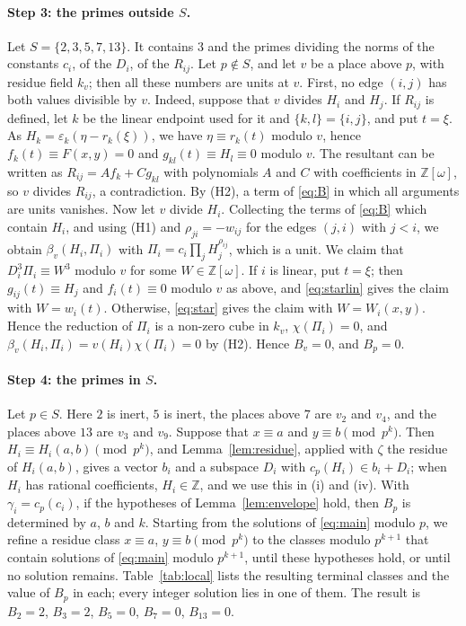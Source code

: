\documentclass[11pt]{article}
\newcommand{\Z}{\mathbb{Z}}
\begin{document}
\paragraph{Step 3: the primes outside $S$.} Let $S=\{2,3,5,7,13\}$. It contains $3$ and the primes dividing the norms of the constants $c_i$, of the $D_i$, of the $R_{ij}$. Let $p\notin S$, and let $v$ be a place above $p$, with residue field $k_v$; then all these numbers are units at $v$. First, no edge $(i,j)$ has both values divisible by $v$. Indeed, suppose that $v$ divides $H_i$ and $H_j$. If $R_{ij}$ is defined, let $k$ be the linear endpoint used for it and $\{k,l\}=\{i,j\}$, and put $t=\xi$. As $H_k=\varepsilon_k(\eta-r_k(\xi))$, we have $\eta\equiv r_k(t)$ modulo $v$, hence $f_k(t)\equiv F(x,y)=0$ and $g_{kl}(t)\equiv H_l\equiv0$ modulo $v$. The resultant can be written as $R_{ij}=Af_k+Cg_{kl}$ with polynomials $A$ and $C$ with coefficients in $\Z[\omega]$, so $v$ divides $R_{ij}$, a contradiction. By (H2), a term of \eqref{eq:B} in which all arguments are units vanishes. Now let $v$ divide $H_i$. Collecting the terms of \eqref{eq:B} which contain $H_i$, and using (H1) and $\rho_{ji}=-w_{ij}$ for the edges $(j,i)$ with $j<i$, we obtain $\beta_v(H_i,\Pi_i)$ with $\Pi_i=c_i\prod_jH_j^{\rho_{ij}}$, which is a unit. We claim that $D_i^3\Pi_i\equiv W^3$ modulo $v$ for some $W\in\Z[\omega]$. If $i$ is linear, put $t=\xi$; then $g_{ij}(t)\equiv H_j$ and $f_i(t)\equiv0$ modulo $v$ as above, and \eqref{eq:starlin} gives the claim with $W=w_i(t)$. Otherwise, \eqref{eq:star} gives the claim with $W=W_i(x,y)$. Hence the reduction of $\Pi_i$ is a non-zero cube in $k_v$, $\chi(\Pi_i)=0$, and $\beta_v(H_i,\Pi_i)=v(H_i)\chi(\Pi_i)=0$ by (H2). Hence $B_v=0$, and $B_p=0$.

\paragraph{Step 4: the primes in $S$.} Let $p\in S$. Here $2$ is inert, $5$ is inert, the places above $7$ are $v_{2}$ and $v_{4}$, and the places above $13$ are $v_{3}$ and $v_{9}$. Suppose that $x\equiv a$ and $y\equiv b\pmod{p^k}$. Then $H_i\equiv H_i(a,b)\pmod{p^k}$, and Lemma~\ref{lem:residue}, applied with $\zeta$ the residue of $H_i(a,b)$, gives a vector $b_i$ and a subspace $D_i$ with $c_p(H_i)\in b_i+D_i$; when $H_i$ has rational coefficients, $H_i\in\Z$, and we use this in (i) and (iv). With $\gamma_i=c_p(c_i)$, if the hypotheses of Lemma~\ref{lem:envelope} hold, then $B_p$ is determined by $a$, $b$ and $k$. Starting from the solutions of \eqref{eq:main} modulo $p$, we refine a residue class $x\equiv a$, $y\equiv b\pmod{p^k}$ to the classes modulo $p^{k+1}$ that contain solutions of \eqref{eq:main} modulo $p^{k+1}$, until these hypotheses hold, or until no solution remains. Table~\ref{tab:local} lists the resulting terminal classes and the value of $B_p$ in each; every integer solution lies in one of them. The result is $B_{2}=2$, $B_{3}=2$, $B_{5}=0$, $B_{7}=0$, $B_{13}=0$.
\end{document}
